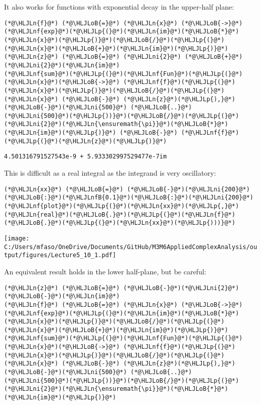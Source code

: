 \documentclass[12pt,landscape]{article}
\newcommand{\HLJLn}[1]{#1}
\newcommand{\HLJLnf}[1]{\textcolor[RGB]{66,102,213}{#1}}
\newcommand{\HLJLnfB}[1]{\textcolor[RGB]{59,151,46}{#1}}
\newcommand{\HLJLni}[1]{\textcolor[RGB]{59,151,46}{#1}}
\newcommand{\HLJLoB}[1]{\textcolor[RGB]{102,102,102}{\textbf{#1}}}
\newcommand{\HLJLp}[1]{#1}
\def\cent#1{\begin{center}#1\end{center} }
\begin{document}
{It also works for functions with exponential decay in the upper-half plane:


\begin{lstlisting}
(*@\HLJLn{f}@*) (*@\HLJLoB{=}@*) (*@\HLJLn{x}@*) (*@\HLJLoB{->}@*) (*@\HLJLnf{exp}@*)(*@\HLJLp{(}@*)(*@\HLJLn{im}@*)(*@\HLJLoB{*}@*)(*@\HLJLn{x}@*)(*@\HLJLp{)}@*)(*@\HLJLoB{/}@*)(*@\HLJLp{(}@*)(*@\HLJLn{x}@*)(*@\HLJLoB{+}@*)(*@\HLJLn{im}@*)(*@\HLJLp{)}@*)
(*@\HLJLn{z}@*) (*@\HLJLoB{=}@*) (*@\HLJLni{2}@*) (*@\HLJLoB{+}@*) (*@\HLJLni{2}@*)(*@\HLJLn{im}@*)
(*@\HLJLnf{sum}@*)(*@\HLJLp{(}@*)(*@\HLJLnf{Fun}@*)(*@\HLJLp{(}@*)(*@\HLJLn{x}@*)(*@\HLJLoB{->}@*) (*@\HLJLnf{f}@*)(*@\HLJLp{(}@*)(*@\HLJLn{x}@*)(*@\HLJLp{)}@*)(*@\HLJLoB{/}@*)(*@\HLJLp{(}@*)(*@\HLJLn{x}@*) (*@\HLJLoB{-}@*) (*@\HLJLn{z}@*)(*@\HLJLp{),}@*) (*@\HLJLoB{-}@*)(*@\HLJLni{500}@*) (*@\HLJLoB{..}@*) (*@\HLJLni{500}@*)(*@\HLJLp{))}@*)(*@\HLJLoB{/}@*)(*@\HLJLp{(}@*)(*@\HLJLni{2}@*)(*@\HLJLn{\ensuremath{\pi}}@*)(*@\HLJLoB{*}@*)(*@\HLJLn{im}@*)(*@\HLJLp{)}@*) (*@\HLJLoB{-}@*) (*@\HLJLnf{f}@*)(*@\HLJLp{(}@*)(*@\HLJLn{z}@*)(*@\HLJLp{)}@*)
\end{lstlisting}

\begin{lstlisting}
4.501316791527543e-9 + 5.933302997529477e-7im
\end{lstlisting}


This is difficult as a real integral as the integrand is very oscillatory:


\begin{lstlisting}
(*@\HLJLn{xx}@*) (*@\HLJLoB{=}@*) (*@\HLJLoB{-}@*)(*@\HLJLni{200}@*)(*@\HLJLoB{:}@*)(*@\HLJLnfB{0.1}@*)(*@\HLJLoB{:}@*)(*@\HLJLni{200}@*)
(*@\HLJLnf{plot}@*)(*@\HLJLp{(}@*)(*@\HLJLn{xx}@*)(*@\HLJLp{,}@*)(*@\HLJLn{real}@*)(*@\HLJLoB{.}@*)(*@\HLJLp{(}@*)(*@\HLJLn{f}@*)(*@\HLJLoB{.}@*)(*@\HLJLp{(}@*)(*@\HLJLn{xx}@*)(*@\HLJLp{)))}@*)
\end{lstlisting}

\cent{\texttt{[image: C:/Users/mfaso/OneDrive/Documents/GitHub/M3M6AppliedComplexAnalysis/output/figures/Lecture5\_10\_1.pdf]}}

An equivalent result holds in the lower half-plane, but be careful:


\begin{lstlisting}
(*@\HLJLn{z}@*) (*@\HLJLoB{=}@*) (*@\HLJLoB{-}@*)(*@\HLJLni{2}@*)(*@\HLJLoB{-}@*)(*@\HLJLn{im}@*)
(*@\HLJLn{f}@*) (*@\HLJLoB{=}@*) (*@\HLJLn{x}@*) (*@\HLJLoB{->}@*) (*@\HLJLnf{exp}@*)(*@\HLJLp{(}@*)(*@\HLJLn{im}@*)(*@\HLJLoB{*}@*)(*@\HLJLn{x}@*)(*@\HLJLp{)}@*)(*@\HLJLoB{/}@*)(*@\HLJLp{(}@*)(*@\HLJLn{x}@*)(*@\HLJLoB{+}@*)(*@\HLJLn{im}@*)(*@\HLJLp{)}@*)
(*@\HLJLnf{sum}@*)(*@\HLJLp{(}@*)(*@\HLJLnf{Fun}@*)(*@\HLJLp{(}@*)(*@\HLJLn{x}@*)(*@\HLJLoB{->}@*) (*@\HLJLnf{f}@*)(*@\HLJLp{(}@*)(*@\HLJLn{x}@*)(*@\HLJLp{)}@*)(*@\HLJLoB{/}@*)(*@\HLJLp{(}@*)(*@\HLJLn{x}@*) (*@\HLJLoB{-}@*) (*@\HLJLn{z}@*)(*@\HLJLp{),}@*) (*@\HLJLoB{-}@*)(*@\HLJLni{500}@*) (*@\HLJLoB{..}@*) (*@\HLJLni{500}@*)(*@\HLJLp{))}@*)(*@\HLJLoB{/}@*)(*@\HLJLp{(}@*)(*@\HLJLni{2}@*)(*@\HLJLn{\ensuremath{\pi}}@*)(*@\HLJLoB{*}@*)(*@\HLJLn{im}@*)(*@\HLJLp{)}@*)
\end{lstlisting}

}
\end{document}
